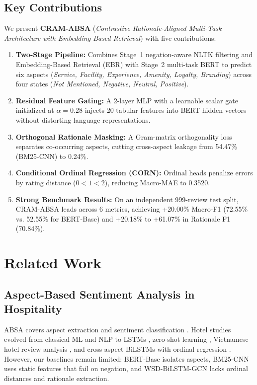 \documentclass{llncs}
\begin{document}
\subsection{Key Contributions}
\label{subsec:key_contributions}
We present \textbf{CRAM-ABSA} (\textit{Contrastive Rationale-Aligned Multi-Task Architecture with Embedding-Based Retrieval}) with five contributions:
\begin{enumerate}[label=(\roman*)]
    \item \textbf{Two-Stage Pipeline:} Combines Stage~1 negation-aware NLTK filtering and Embedding-Based Retrieval (EBR) with Stage~2 multi-task BERT to predict six aspects (\textit{Service, Facility, Experience, Amenity, Loyalty, Branding}) across four states (\textit{Not Mentioned, Negative, Neutral, Positive}).
    \item \textbf{Residual Feature Gating:} A 2-layer MLP with a learnable scalar gate initialized at $\alpha = 0.28$ injects 20 tabular features into BERT hidden vectors without distorting language representations.
    \item \textbf{Orthogonal Rationale Masking:} A Gram-matrix orthogonality loss separates co-occurring aspects, cutting cross-aspect leakage from 54.47\% (BM25-CNN) to 0.24\%.
    \item \textbf{Conditional Ordinal Regression (CORN):} Ordinal heads penalize errors by rating distance ($0 < 1 < 2$), reducing Macro-MAE to 0.3520.
    \item \textbf{Strong Benchmark Results:} On an independent 999-review test split, CRAM-ABSA leads across 6 metrics, achieving +20.00\% Macro-F1 (72.55\% vs. 52.55\% for BERT-Base) and +20.18\% to +61.07\% in Rationale F1 (70.84\%).
\end{enumerate}

\section{Related Work}
\label{sec:related_work}

\subsection{Aspect-Based Sentiment Analysis in Hospitality}
\label{subsec:rw_absa_hospitality}
ABSA covers aspect extraction and sentiment classification \cite{ref18_brauwers2022}. Hotel studies evolved from classical ML and NLP \cite{ref07_apriliani2020,ref08_ounacer2023} to LSTMs \cite{ref29_jayanto2022}, zero-shot learning \cite{ref05_nawawi2024}, Vietnamese hotel review analysis \cite{ref10_nguyen2023,ref25_le2026}, and cross-aspect BiLSTMs with ordinal regression \cite{ref30_tran2026}. However, our baselines remain limited: BERT-Base \cite{ref01_bimaputra2023} isolates aspects, BM25-CNN \cite{ref04_namee2023} uses static features that fail on negation, and WSD-BiLSTM-GCN \cite{ref09_nadeem2025} lacks ordinal distances and rationale extraction.
\end{document}
